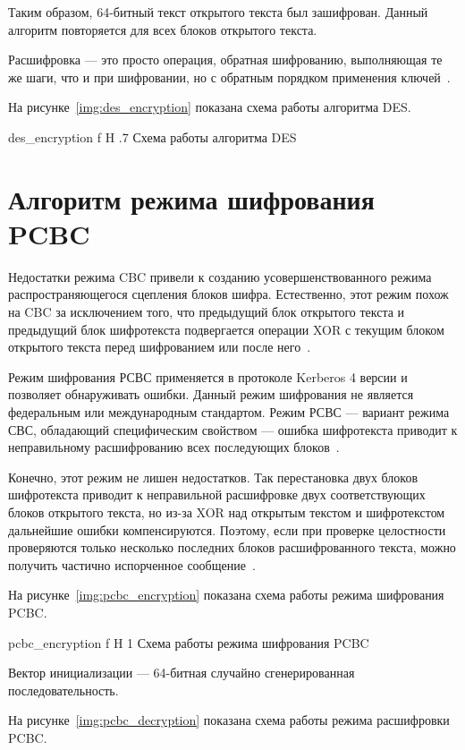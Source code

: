 \documentclass{bmstu}
\begin{document}
Таким образом, 64-битный текст открытого текста был зашифрован. 
Данный алгоритм повторяется для всех блоков открытого текста.

Расшифровка --- это просто операция, обратная шифрованию, выполняющая те же шаги, что и при шифровании, но с обратным порядком применения ключей~\cite{grabbe}.

На рисунке~\ref{img:des_encryption} показана схема работы алгоритма DES.

    {des_encryption}
    {f}
    {H}
    {.7\textwidth}
    {Схема работы алгоритма DES~\cite{wiki-des}}

\chapter{Алгоритм режима шифрования PCBC}

Недостатки режима CBC привели к созданию усовершенствованного режима распространяющегося сцепления блоков шифра. 
Естественно, этот режим похож на CBC за исключением того, что предыдущий блок открытого текста и предыдущий блок шифротекста подвергается операции XOR с текущим блоком открытого текста перед шифрованием или после него~\cite{wiki-pcbc}.

Режим шифрования РСВС применяется в протоколе Kerberos 4 версии и позволяет обнаруживать ошибки. 
Данный режим шифрования не является федеральным или международным стандартом. 
Режим РСВС --- вариант режима СВС, обладающий специфическим свойством --- ошибка шифротекста приводит к неправильному расшифрованию всех последующих блоков~\cite{wiki-pcbc}. 

Конечно, этот режим не лишен недостатков. 
Так перестановка двух блоков шифротекста приводит к неправильной расшифровке двух соответствующих блоков открытого текста, но из-за XOR над открытым текстом и шифротекстом дальнейшие ошибки компенсируются. 
Поэтому, если при проверке целостности проверяются только несколько последних блоков расшифрованного текста, можно получить частично испорченное сообщение~\cite{wiki-pcbc}.

На рисунке~\ref{img:pcbc_encryption} показана схема работы режима шифрования PCBC.

    {pcbc_encryption}
    {f}
    {H}
    {1\textwidth}
    {Схема работы режима шифрования PCBC~\cite{wiki-pcbc}}
    
Вектор инициализации --- 64-битная случайно сгенерированная последовательность.

\pagebreak
На рисунке~\ref{img:pcbc_decryption} показана схема работы режима расшифровки PCBC.
\end{document}

